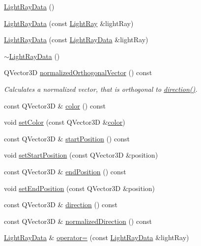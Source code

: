 \begin{DoxyCompactItemize}
\item 
\hyperlink{class_light_ray_data_ac0cb11da1651f8ff7b8ed9d785b68a27}{Light\+Ray\+Data} ()
\item 
\hyperlink{class_light_ray_data_a50350aa163fd7c1a54f97cefafd2d2f7}{Light\+Ray\+Data} (const \hyperlink{class_light_ray}{Light\+Ray} \&light\+Ray)
\item 
\hyperlink{class_light_ray_data_a9344f139cafb257f61f4d800fbecd905}{Light\+Ray\+Data} (const \hyperlink{class_light_ray_data}{Light\+Ray\+Data} \&light\+Ray)
\item 
\hyperlink{class_light_ray_data_a6cd92465c9ba1da296d30a32487a6ac0}{$\sim$\+Light\+Ray\+Data} ()
\item 
Q\+Vector3\+D \hyperlink{class_light_ray_data_acada2319ae380a11a405817cd9cd3d65}{normalized\+Orthogonal\+Vector} () const 
\begin{DoxyCompactList}\small\item\em Calculates a normalized vector, that is orthogonal to \hyperlink{class_light_ray_data_aaecf9f1d378eebf6d577eaa588930a4f}{direction()}. \end{DoxyCompactList}\item 
const Q\+Vector3\+D \& \hyperlink{class_light_ray_data_a64a5b7f8d4c3af9cc3e8c1a6c6ea8c57}{color} () const 
\item 
void \hyperlink{class_light_ray_data_ad8fead207765a43bb1167e2ce95e85a4}{set\+Color} (const Q\+Vector3\+D \&\hyperlink{class_light_ray_data_a64a5b7f8d4c3af9cc3e8c1a6c6ea8c57}{color})
\item 
const Q\+Vector3\+D \& \hyperlink{class_light_ray_data_af040092e873e42d0d31f803452fc648e}{start\+Position} () const 
\item 
void \hyperlink{class_light_ray_data_a464a868047052152f375cb45ac476eb2}{set\+Start\+Position} (const Q\+Vector3\+D \&position)
\item 
const Q\+Vector3\+D \& \hyperlink{class_light_ray_data_ab47d397dcffe8a2c8da0cf4d8bbbd2bc}{end\+Position} () const 
\item 
void \hyperlink{class_light_ray_data_ad7ec7b96408f0fb7f603687c54804d3b}{set\+End\+Position} (const Q\+Vector3\+D \&position)
\item 
const Q\+Vector3\+D \& \hyperlink{class_light_ray_data_aaecf9f1d378eebf6d577eaa588930a4f}{direction} () const 
\item 
const Q\+Vector3\+D \& \hyperlink{class_light_ray_data_a791bbf3c85d32004d0d7d155cd248a43}{normalized\+Direction} () const 
\item 
\hyperlink{class_light_ray_data}{Light\+Ray\+Data} \& \hyperlink{class_light_ray_data_a2dc01f58929829517a90b1fc29f12942}{operator=} (const \hyperlink{class_light_ray_data}{Light\+Ray\+Data} \&light\+Ray)
\end{DoxyCompactItemize}
